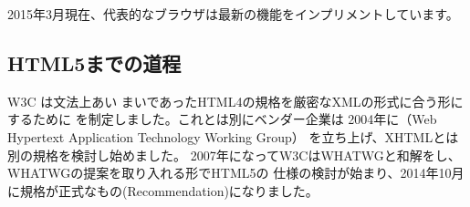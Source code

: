 2015年3月現在、代表的なブラウザは最新の機能をインプリメントしています。
\subsection{HTML5までの道程}
W3C は文法上あい
まいであったHTML4の規格を厳密なXMLの形式に合う形にするために
\cite{XHTML}を制定しました。これとは別にベンダー企業は
2004年に（Web Hypertext Application Technology Working Group）
を立ち上げ、XHTMLとは別の規格を検討し始めました。
2007年になってW3CはWHATWGと和解をし、WHATWGの提案を取り入れる形でHTML5の
仕様の検討が始まり、2014年10月に規格が正式なもの(Recommendation)になりました。

